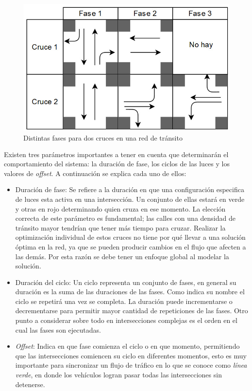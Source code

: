 \begin{figure}[H]
	\centering
	\includegraphics[width=0.8\linewidth]{Figures/fases1}
	\caption{Distintas fases para dos cruces en una red de tránsito}
	\label{fig:fases}
\end{figure}

Existen tres parámetros importantes a tener en cuenta que determinarán el comportamiento del sistema: la duración de fase, los ciclos de las luces y los valores de \emph{offset}. 
A continuación se explica cada uno de ellos:


\begin{itemize}
 	\item Duración de fase: Se refiere a la duración en que una configuración especifica de luces esta activa en una intersección. Un conjunto de ellas estará en verde y otras en rojo determinando quien cruza en ese momento. La elección correcta de este parámetro es fundamental; las calles con una densidad de tránsito mayor tendrían que tener más tiempo para cruzar. Realizar la optimización individual de estos cruces no tiene por qué llevar a una solución óptima en la red, ya que se pueden producir cambios en el flujo que afecten a las demás. Por esta razón se debe tener un enfoque global al modelar la solución.
 	
 	\item Duración del ciclo: Un ciclo representa un conjunto de fases, en general su duración es la suma de las duraciones de las fases. Como indica su nombre el ciclo se repetirá una vez se completa. La duración puede incrementarse o decrementarse para permitir mayor cantidad de repeticiones de las fases. Otro punto a considerar sobre todo en intersecciones complejas es el orden en el cual las fases son ejecutadas.
 	
 	\item \emph{Offset}: Indica en que fase comienza el ciclo o en que momento, permitiendo que las intersecciones comiencen su ciclo en diferentes momentos, esto es muy importante para sincronizar un flujo de tráfico en lo que se conoce como \emph{línea verde}, en donde los vehículos logran pasar todas las intersecciones sin detenerse.
\end{itemize}


